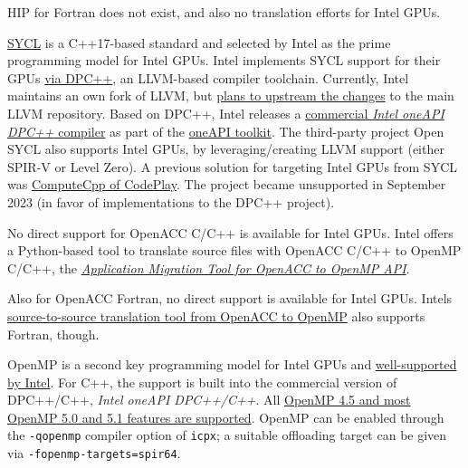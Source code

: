 HIP for Fortran does not exist, and also no translation efforts for Intel GPUs. 

 \href{https://www.khronos.org/sycl/}{SYCL} is a C++17-based standard and selected by Intel as the prime programming model for Intel GPUs. Intel implements SYCL support for their GPUs \href{https://github.com/intel/llvm}{via DPC++}, an LLVM-based compiler toolchain. Currently, Intel maintains an own fork of LLVM, but \href{https://lists.llvm.org/pipermail/cfe-dev/2019-January/060811.html}{plans to upstream the changes} to the main LLVM repository. Based on DPC++, Intel releases a \href{https://www.intel.com/content/www/us/en/developer/tools/oneapi/dpc-compiler.html}{commercial \emph{Intel oneAPI DPC++} compiler} as part of the \href{https://www.intel.com/content/www/us/en/developer/tools/oneapi/toolkits.html}{oneAPI toolkit}. The third-party project Open SYCL also supports Intel GPUs, by leveraging/creating LLVM support (either SPIR-V or Level Zero). A previous solution for targeting Intel GPUs from SYCL was \href{https://developer.codeplay.com/products/computecpp/ce/home/}{ComputeCpp of CodePlay}. The project became unsupported in September 2023 (in favor of implementations to the DPC++ project).   

 No direct support for OpenACC C/C++ is available for Intel GPUs. Intel offers a Python-based tool to translate source files with OpenACC C/C++ to OpenMP C/C++, the \href{https://github.com/intel/intel-application-migration-tool-for-openacc-to-openmp}{\emph{Application Migration Tool for OpenACC to OpenMP API}}.   

 Also for OpenACC Fortran, no direct support is available for Intel GPUs. Intel\textquotesingle s \href{https://github.com/intel/intel-application-migration-tool-for-openacc-to-openmp}{source-to-source translation tool from OpenACC to OpenMP} also supports Fortran, though.   

 OpenMP is a second key programming model for Intel GPUs and \href{https://www.intel.com/content/www/us/en/develop/documentation/get-started-with-cpp-fortran-compiler-openmp/top.html}{well-supported by Intel}. For C++, the support is built into the commercial version of DPC++/C++, \emph{Intel oneAPI DPC++/C++}. All \href{https://www.intel.com/content/www/us/en/developer/articles/technical/openmp-features-and-extensions-supported-in-icx.html}{OpenMP 4.5 and most OpenMP 5.0 and 5.1 features are supported}. OpenMP can be enabled through the \texttt{-qopenmp} compiler option of \texttt{icpx}; a suitable offloading target can be given via \texttt{-fopenmp-targets=spir64}.   

